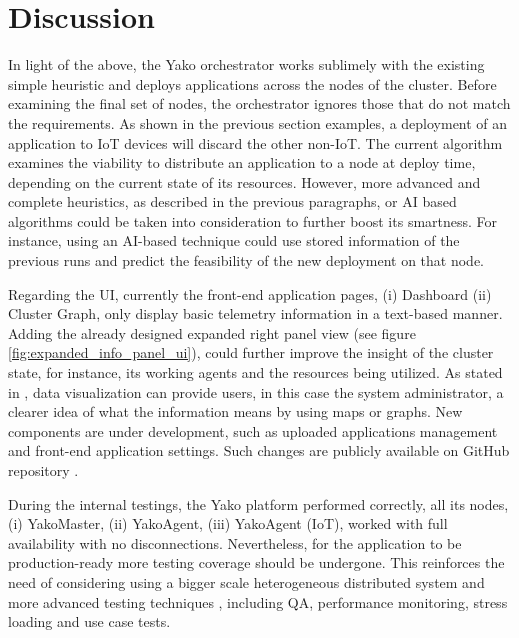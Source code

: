 \section{Discussion}
    In light of the above, the Yako orchestrator works sublimely with the existing simple heuristic and deploys applications across the nodes of the cluster. Before examining the final set of nodes, the orchestrator ignores those that do not match the requirements. As shown in the previous section examples, a deployment of an application to IoT devices will discard the other non-IoT.
    The current algorithm examines the viability to distribute an application to a node at deploy time, depending on the current state of its resources. However, more advanced and complete heuristics, as described in the previous paragraphs, or AI based algorithms could be taken into consideration to further boost its smartness. For instance, using an AI-based technique could use stored information of the previous runs and predict the feasibility of the new deployment on that node.
    
    Regarding the UI, currently the front-end application pages, (i) Dashboard (ii) Cluster Graph, only display basic telemetry information in a text-based manner. Adding the already designed expanded right panel view (see figure \ref{fig:expanded_info_panel_ui}), could further improve the insight of the cluster state, for instance, its working agents and the resources being utilized. As stated in \cite{stark_why_2020}, data visualization can provide users, in this case the system administrator, a clearer idea of what the information means by using maps or graphs.
    New components are under development, such as uploaded applications management and front-end application settings. Such changes are publicly available on GitHub repository \cite{chen_yakoui_2022}.
    
    During the internal testings, the Yako platform performed correctly, all its nodes, (i) YakoMaster, (ii) YakoAgent, (iii) YakoAgent (IoT), worked with full availability with no disconnections.
    Nevertheless, for the application to be production-ready more testing coverage should be undergone. This reinforces the need of considering using a bigger scale heterogeneous distributed system and more advanced testing techniques \cite{neeru360_software_2021}, including QA, performance monitoring, stress loading and use case tests.